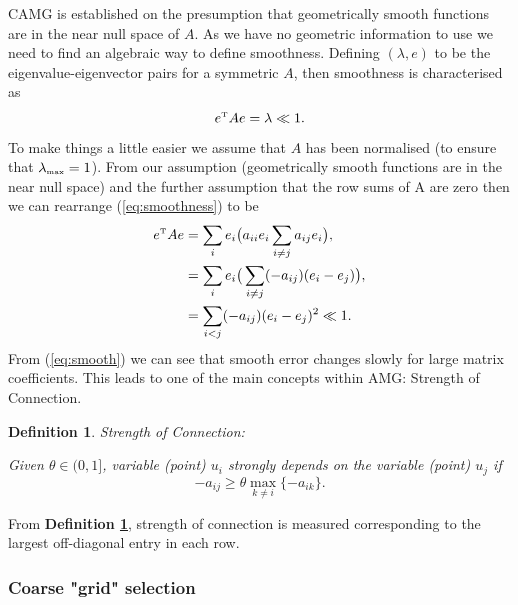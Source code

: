 \documentclass[11pt]{article}
\numberwithin{equation}{section}    %
\newtheorem{mydef}{Definition}
\begin{document}
CAMG is established on the presumption that geometrically smooth functions are in the near null space of $A$. As we have no geometric information to use we need to find an algebraic way to define smoothness. Defining $(\lambda,e)$ to be the eigenvalue-eigenvector pairs for a symmetric $A$, then smoothness is characterised as
\begin{equation} \label{eq:smoothness}
    e^{\mbox{\tiny{T}}}Ae = \lambda \ll 1.
\end{equation}
To make things a little easier we assume that $A$ has been normalised (to ensure that $\lambda_{\mbox{\tiny{max}}}=1$). From our assumption (geometrically smooth functions are in the near null space) and the further assumption that the row sums of A are zero then we can rearrange (\ref{eq:smoothness}) to be
\begin{equation} \label{eq:smooth}
    \begin{aligned}
        e^{\mbox{\tiny{T}}}Ae &= \sum_i e_i\big( a_{ii}e_i\sum_{i\neq j} a_{ij}e_i\big),\\
                                               &= \sum_i e_i\big( \sum_{i\neq j} (-a_{ij})(e_i-e_j)\big),\\
                                               &= \sum_{i<j} (-a_{ij})(e_i-e_j)^2 \ll 1.
    \end{aligned}
\end{equation}
From (\ref{eq:smooth}) we can see that smooth error changes slowly for large matrix coefficients. This leads to one of the main concepts within AMG: Strength of Connection.
\begin{mydef} \label{def:SOC}
Strength of Connection:

Given $\theta \in (0,1]$, variable (point) $u_i$  strongly depends on the variable (point) $u_j$ if
$$-a_{ij}\geq \theta \max_{k\neq i} \{-a_{ik}\}.$$

\end{mydef}

From \textbf{Definition \ref{def:SOC}}, strength of connection is measured corresponding to the largest off-diagonal entry in each row.


\subsubsection*{Coarse "grid" selection}
\end{document}
